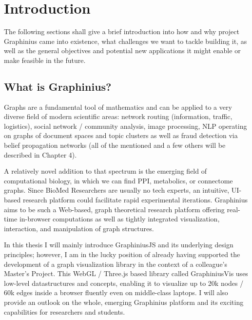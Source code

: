\chapter{Introduction}
\label{ch:introduction}

The following sections shall give a brief introduction into how and why project Graphinius came into existence, what challenges we want to tackle building it, as well as the general objectives and potential new applications it might enable or make feasible in the future.


\section{What is Graphinius?}
\label{sect:intro_whats_graphinius}

Graphs are a fundamental tool of mathematics and can be applied to a very diverse field of modern scientific areas: network routing (information, traffic, logistics), social network / community analysis, image processing, NLP operating on graphs of document spaces and topic clusters as well as fraud detection via belief propagation networks (all of the mentioned and a few others will be described in Chapter 4).

A relatively novel addition to that spectrum is the emerging field of computational biology, in which we can find PPI, metabolics, or connectome graphs. Since BioMed Researchers are usually no tech experts, an intuitive, UI-based research platform could facilitate rapid experimental iterations. Graphinius aims to be such a Web-based, graph theoretical research platform offering real-time in-browser computations as well as tightly integrated visualization, interaction, and manipulation of graph structures. 

In this thesis I will mainly introduce GraphiniusJS and its underlying design principles; however, I am in the lucky position of already having supported the development of a graph visualization library in the context of a colleague's Master's Project. This WebGL / Three.js based library called GraphiniusVis uses low-level datastructures and concepts, enabling it to visualize up to 20k nodes / 60k edges inside a browser fluently even on middle-class laptops. I will also provide an outlook on the whole, emerging Graphinius platform and its exciting capabilities for researchers and students.


